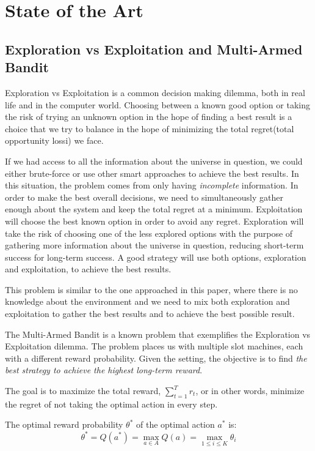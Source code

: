 \section{State of the Art}

\subsection{Exploration vs Exploitation and Multi-Armed Bandit} \label{sec:sota_mab}
Exploration vs Exploitation is a common decision making dilemma, both in real life
and in the computer world. Choosing between a known good option or taking the risk
of trying an unknown option in the hope of finding a best result is a choice that
we try to balance in the hope of minimizing the total regret(total opportunity
lossi\cite{kn:Silver}) we face.

If we had access to all the information about the universe in question, we could
either brute-force or use other smart approaches to achieve the best results. In
this situation, the problem comes from only having \textit{incomplete}
information. In order to make the best overall decisions, we need to
simultaneously gather enough about the system and keep the total regret at a
minimum. Exploitation will choose the best known option in order to avoid any
regret. Exploration will take the risk of choosing one of the less explored
options with the purpose of gathering more information about the universe in
question, reducing short-term success for long-term success. A good strategy will
use both options, exploration and exploitation, to achieve the best results.

This problem is similar to the one approached in this paper, where there is no
knowledge about the environment and we need to mix both exploration and
exploitation to gather the best results and to achieve the best possible result.

The Multi-Armed Bandit is a known problem that exemplifies the Exploration vs
Exploitation dilemma. The problem places us with multiple slot machines, each with
a different reward probability. Given the setting, the objective is to find
\textit{the best strategy to achieve the highest long-term reward}\cite{kn:Weng2018}.


The goal is to maximize the total reward, $\sum^T_{t=1}r_t$, or in other words,
minimize the regret of not taking the optimal action in every step.

The optimal reward probability $\theta^*$ of the optimal action $a^*$ is:
\begin{displaymath}
    \theta^* = Q(a^*) = \max_{a \in A}  Q(a) = \max_{1 \leq i \leq K} \theta_i
\end{displaymath}


